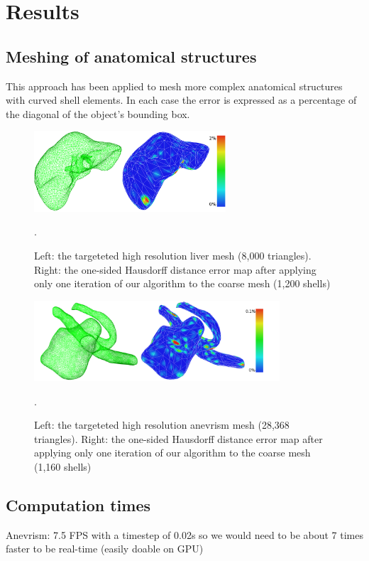 \documentclass{llncs}
\begin{document}
\section{Results}
\label{sec:results}
\subsection{Meshing of anatomical structures}

This approach has been applied to mesh more complex anatomical structures with curved shell elements. In each case the error is expressed as a percentage of the diagonal of the object's bounding box. 

\begin{figure}
\centering
\includegraphics[height=3cm]{images/resultsLiver}
\caption {Left: the targeteted high resolution liver mesh (8,000 triangles). Right: the one-sided Hausdorff distance error map after applying only one iteration of our algorithm to the coarse mesh (1,200 shells)}. 
\label{fig-liver}
\end{figure}

\begin{figure}
\centering
\includegraphics[height=3cm]{images/resultsAnevrism}
\caption {Left: the targeteted high resolution anevrism mesh (28,368 triangles). Right: the one-sided Hausdorff distance error map after applying only one iteration of our algorithm to the coarse mesh (1,160 shells)}.
\label{fig-anevrism}
\end{figure}


\subsection{Computation times}

Anevrism: 7.5 FPS with a timestep of 0.02s so we would need to be about 7 times faster to be real-time (easily doable on GPU)
\end{document}
